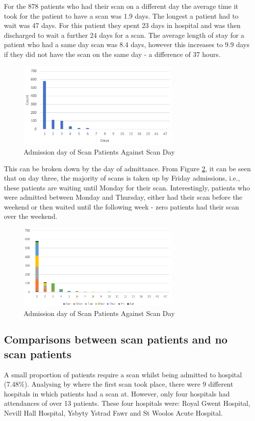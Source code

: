 \documentclass[../thesis.tex]{subfiles}
\begin{document}
For the 878 patients who had their scan on a different day the average time it took for the patient to have a scan was 1.9 days. The longest a patient had to wait was 47 days. For this patient they spent 23 days in hospital and was then discharged to wait a further 24 days for a scan. The average length of stay for a patient who had a same day scan was 8.4 days, however this increases to 9.9 days if they did not have the scan on the same day - a difference of 37 hours. 



\begin{figure}[H]
    \centering
    \includegraphics[width = 8cm]{Chapter3/Figures/ScanWaitTime.png}
    \caption{Admission day of Scan Patients Against Scan Day}
    \label{Fig:ScanWaitTime}
\end{figure}

This can be broken down by the day of admittance. From Figure \ref{Fig:ScanDelayDay}, it can be seen that on day three, the majority of scans is taken up by Friday admissions, i.e., these patients are waiting until Monday for their scan. Interestingly, patients who were admitted between Monday and Thursday, either had their scan before the weekend or then waited until the following week - zero patients had their scan over the weekend.

\begin{figure}[H]
    \centering
    \includegraphics[width = 8cm]{Chapter3/Figures/ScanDelayByDay.png}
    \caption{Admission day of Scan Patients Against Scan Day}
    \label{Fig:ScanDelayDay}
\end{figure}

\subsection{Comparisons between scan patients and no scan patients}
A small proportion of patients require a scan whilst being admitted to hospital (7.48\%). Analysing by where the first scan took place, there were 9 different hospitals in which patients had a scan at. However, only four hospitals had attendances of over 13 patients. These four hospitals were: Royal Gwent Hospital, Nevill Hall Hospital, Ysbyty Ystrad Fawr and St Woolos Acute Hospital.
\end{document}
